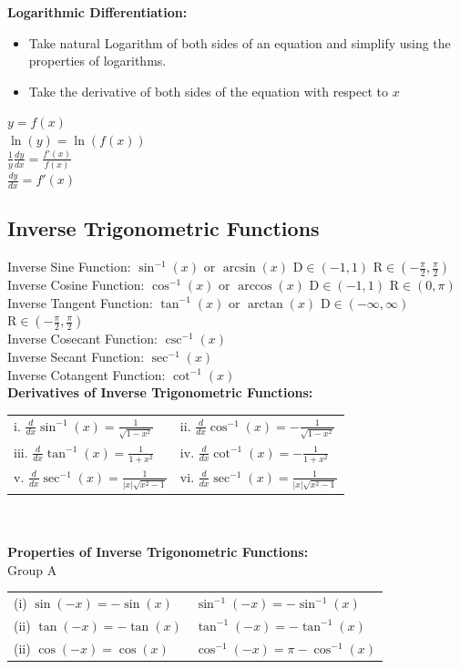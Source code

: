 \documentclass[14pt]{article}
\begin{document}
    \textbf{Logarithmic Differentiation:}
    \begin{itemize}
        \item Take natural Logarithm of both sides of an equation and simplify using the properties of logarithms.
        \item Take the derivative of both sides of the equation with respect to $x$
    \end{itemize}
    $y=f(x)$\\
    $\ln(y)=\ln(f(x))$\\
    $\frac{1}{y} \frac{dy}{dx} = \frac{f'(x)}{f(x)}$\\
    $\frac{dy}{dx}=f'(x)$
    \subsection{Inverse Trigonometric Functions}
    Inverse Sine Function: $\sin^{-1}(x)$ or $\arcsin(x)$ $\mathrm{D}\in(-1,1)$ $\mathrm{R}\in\left(-\frac{\pi}{2},\frac{\pi}{2}\right)$\\
    Inverse Cosine Function: $\cos^{-1}(x)$ or $\arccos(x)$ $\mathrm{D}\in(-1,1)$ $\mathrm{R}\in(0, \pi)$\\
    Inverse Tangent Function: $\tan^{-1}(x)$ or $\arctan(x)$ $\mathrm{D}\in(-\infty,\infty)$ $\mathrm{R}\in\left(-\frac{\pi}{2},\frac{\pi}{2}\right)$\\
    Inverse Cosecant Function: $\csc^{-1}(x)$\\
    Inverse Secant Function: $\sec^{-1}(x)$\\
    Inverse Cotangent Function: $\cot^{-1}(x)$\\
    \textbf{Derivatives of Inverse Trigonometric Functions:}\\
    \begin{tabular}{p{5cm}p{5cm}}
        i. $\frac{d}{dx}\sin^{-1}(x)=\frac{1}{\sqrt{1-x^2}}$ & ii. $\frac{d}{dx}\cos^{-1}(x)=-\frac{1}{\sqrt{1-x^2}}$\\
        iii. $\frac{d}{dx}\tan^{-1}(x)=\frac{1}{1+x^2}$ & iv. $\frac{d}{dx}\cot^{-1}(x)=-\frac{1}{1+x^2}$\\
        v. $\frac{d}{dx}\sec^{-1}(x)=\frac{1}{|x|\sqrt{x^2-1}}$ & vi. $\frac{d}{dx}\sec^{-1}(x)=\frac{1}{|x|\sqrt{x^2-1}}$
    \end{tabular}\\\\
    \textbf{Properties of Inverse Trigonometric Functions:}\\
    Group A\\
    \begin{tabular}{p{5cm}|p{5cm}}
        (i) $\sin(-x)=-\sin(x)$ & $\sin^{-1}(-x)=-\sin^{-1}(x)$\\
        (ii) $\tan(-x)=-\tan(x)$ & $\tan^{-1}(-x)=-\tan^{-1}(x)$\\
        (ii) $\cos(-x)=\cos(x)$ & $\cos^{-1}(-x)=\pi-\cos^{-1}(x)$
    \end{tabular}\\
\end{document}
